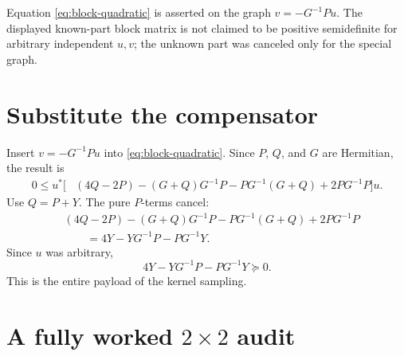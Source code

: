 \documentclass[11pt,oneside,openany]{book}
\theoremstyle{definition}
\theoremstyle{remark}
\begin{document}
\begin{pitfall}
Equation \eqref{eq:block-quadratic} is asserted on the graph
\(v=-G^{-1}Pu\).  The displayed known-part block matrix is not claimed
to be positive semidefinite for arbitrary independent \(u,v\); the
unknown part was canceled only for the special graph.
\end{pitfall}

\section{Substitute the compensator}

Insert \(v=-G^{-1}Pu\) into \eqref{eq:block-quadratic}.  Since \(P\),
\(Q\), and \(G\) are Hermitian, the result is
\begin{align}
0\leq u^*\bigl[
 &(4Q-2P)
 -(G+Q)G^{-1}P
 -PG^{-1}(G+Q)
 +2PG^{-1}P
\bigr]u.
\label{eq:before-Y}
\end{align}
Use \(Q=P+Y\).  The pure \(P\)-terms cancel:
\begin{align*}
&(4Q-2P)
 -(G+Q)G^{-1}P
 -PG^{-1}(G+Q)
 +2PG^{-1}P\\
&\qquad
=4Y-YG^{-1}P-PG^{-1}Y.
\end{align*}
Since \(u\) was arbitrary,
\begin{equation}
  4Y-YG^{-1}P-PG^{-1}Y\succeq0.
  \label{eq:Y-inequality}
\end{equation}
This is the entire payload of the kernel sampling.

\section{A fully worked \texorpdfstring{\(2\times2\)}{2 by 2} audit}
\end{document}
